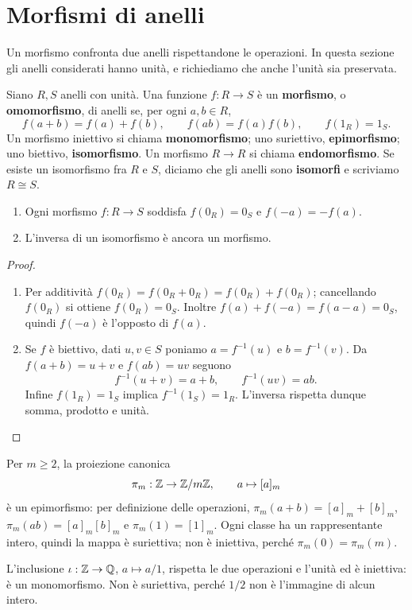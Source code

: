 \section{Morfismi di anelli}
Un morfismo confronta due anelli rispettandone le operazioni. In questa sezione gli anelli considerati hanno unità, e richiediamo che anche l'unità sia preservata.

\begin{definizione}
Siano $R,S$ anelli con unità. Una funzione $f:R\to S$ è un \textbf{morfismo}, o \textbf{omomorfismo}, di anelli se, per ogni $a,b\in R$,
\[
f(a+b)=f(a)+f(b),\qquad f(ab)=f(a)f(b),\qquad f(1_R)=1_S.
\]
Un morfismo iniettivo si chiama \textbf{monomorfismo}; uno suriettivo, \textbf{epimorfismo}; uno biettivo, \textbf{isomorfismo}. Un morfismo $R\to R$ si chiama \textbf{endomorfismo}. Se esiste un isomorfismo fra $R$ e $S$, diciamo che gli anelli sono \textbf{isomorfi} e scriviamo $R\cong S$.
\end{definizione}

\begin{proposizione}\label{prop:morfismi-zero}
\begin{enumerate}[label=\arabic*.]
\item Ogni morfismo $f:R\to S$ soddisfa $f(0_R)=0_S$ e $f(-a)=-f(a)$.
\item L'inversa di un isomorfismo è ancora un morfismo.
\end{enumerate}
\end{proposizione}
\begin{proof}
\begin{enumerate}[label=\arabic*.]
\item Per additività $f(0_R)=f(0_R+0_R)=f(0_R)+f(0_R)$; cancellando $f(0_R)$ si ottiene $f(0_R)=0_S$. Inoltre $f(a)+f(-a)=f(a-a)=0_S$, quindi $f(-a)$ è l'opposto di $f(a)$.
\item Se $f$ è biettivo, dati $u,v\in S$ poniamo $a=f^{-1}(u)$ e $b=f^{-1}(v)$. Da $f(a+b)=u+v$ e $f(ab)=uv$ seguono
\[
f^{-1}(u+v)=a+b,\qquad f^{-1}(uv)=ab.
\]
Infine $f(1_R)=1_S$ implica $f^{-1}(1_S)=1_R$. L'inversa rispetta dunque somma, prodotto e unità.\qedhere
\end{enumerate}
\end{proof}

\begin{esempio}
Per $m\ge2$, la proiezione canonica
\[
\pi_m:\mathbb{Z}\to\mathbb{Z}/m\mathbb{Z},\qquad a\mapsto[a]_m
\]
è un epimorfismo: per definizione delle operazioni, $\pi_m(a+b)=[a]_m+[b]_m$, $\pi_m(ab)=[a]_m[b]_m$ e $\pi_m(1)=[1]_m$. Ogni classe ha un rappresentante intero, quindi la mappa è suriettiva; non è iniettiva, perché $\pi_m(0)=\pi_m(m)$.

L'inclusione $\iota:\mathbb{Z}\to\mathbb{Q}$, $a\mapsto a/1$, rispetta le due operazioni e l'unità ed è iniettiva: è un monomorfismo. Non è suriettiva, perché $1/2$ non è l'immagine di alcun intero.
\end{esempio}

